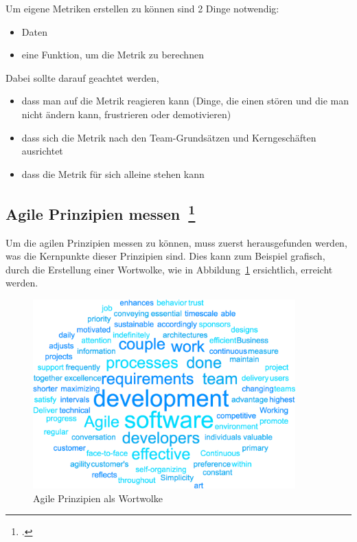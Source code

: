 Um eigene Metriken erstellen zu können sind 2 Dinge notwendig:
\begin{itemize}[noitemsep]
  \item Daten
  \item eine Funktion, um die Metrik zu berechnen
\end{itemize}

Dabei sollte darauf geachtet werden,
\begin{itemize}[noitemsep]
  \item dass man auf die Metrik reagieren kann (Dinge, die einen stören und die man nicht ändern kann, frustrieren oder demotivieren)
  \item dass sich die Metrik nach den Team-Grundsätzen und Kerngeschäften ausrichtet
  \item dass die Metrik für sich alleine stehen kann
\end{itemize}

\subsection[Agile Prinzipien messen]{Agile Prinzipien messen~\footcite[vgl.][S.201ff]{davis_agile_2015}}

Um die agilen Prinzipien messen zu können, muss zuerst herausgefunden werden, was die Kernpunkte dieser Prinzipien sind.
Dies kann zum Beispiel grafisch, durch die Erstellung einer Wortwolke, wie in Abbildung~\ref{fig:wordcloud_principles} ersichtlich, erreicht werden.

\begin{savenotes}
  \begin{figure}[H] 
    \centering
    \includegraphics[width=0.9\textwidth]{img/principles-wordcloud.png}
    \caption{Agile Prinzipien als Wortwolke}\label{fig:wordcloud_principles}
  \end{figure}
\end{savenotes}

